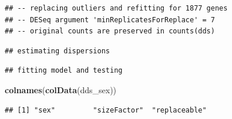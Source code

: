 \documentclass[
]{article}
\newenvironment{Shaded}{\begin{snugshade}}{\end{snugshade}}
\newcommand{\AttributeTok}[1]{\textcolor[rgb]{0.13,0.29,0.53}{#1}}
\newcommand{\CommentTok}[1]{\textcolor[rgb]{0.56,0.35,0.01}{\textit{#1}}}
\newcommand{\DecValTok}[1]{\textcolor[rgb]{0.00,0.00,0.81}{#1}}
\newcommand{\FunctionTok}[1]{\textcolor[rgb]{0.13,0.29,0.53}{\textbf{#1}}}
\newcommand{\NormalTok}[1]{#1}
\newcommand{\OtherTok}[1]{\textcolor[rgb]{0.56,0.35,0.01}{#1}}
\newcommand{\SpecialCharTok}[1]{\textcolor[rgb]{0.81,0.36,0.00}{\textbf{#1}}}
\newcommand{\StringTok}[1]{\textcolor[rgb]{0.31,0.60,0.02}{#1}}
\begin{document}
\begin{verbatim}
## -- replacing outliers and refitting for 1877 genes
## -- DESeq argument 'minReplicatesForReplace' = 7 
## -- original counts are preserved in counts(dds)
\end{verbatim}

\begin{verbatim}
## estimating dispersions
\end{verbatim}

\begin{verbatim}
## fitting model and testing
\end{verbatim}

\begin{Shaded}
\begin{Highlighting}[]
\FunctionTok{colnames}\NormalTok{(}\FunctionTok{colData}\NormalTok{(dds\_sex))}
\end{Highlighting}
\end{Shaded}

\begin{verbatim}
## [1] "sex"         "sizeFactor"  "replaceable"
\end{verbatim}

\begin{Shaded}
\end{Shaded}
\end{document}

